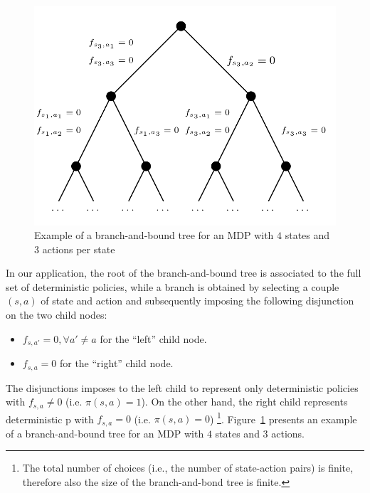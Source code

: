 \documentclass[runningheads,a4paper]{llncs}
\begin{document}
\begin{figure}
	\begin{center}
    \includegraphics[scale=0.22]{images/bb.png}
	\end{center}
	\caption{Example of a branch-and-bound tree for an MDP with $4$ states and $3$ actions per state}
	\label{fig:pic_bb}
\end{figure}


In our application, the root of the branch-and-bound tree is associated to the full set of deterministic policies, while a branch is obtained by selecting a couple $(s,a)$ of state and action and subsequently imposing the following disjunction on the two child nodes:
\begin{itemize}
\item $f_{s,a'}=0, \forall a'\neq a$ for the ``left'' child node.
\item $f_{s,a}=0$ for the ``right'' child node. 
\end{itemize} 
The disjunctions imposes to the left child to represent only deterministic policies with $f_{s,a}\neq 0$  (i.e. $\pi(s,a)=1$). On the other hand, the right child represents deterministic p with $f_{s,a}=0$  (i.e. $\pi(s,a)=0$)
\footnote{The total number of choices (i.e., the number of state-action pairs) is finite, therefore also the size of the branch-and-bond tree is finite.}. Figure~\ref{fig:pic_bb} presents an example of a branch-and-bound tree for an MDP with $4$ states and $3$ actions. 
 
\end{document}
